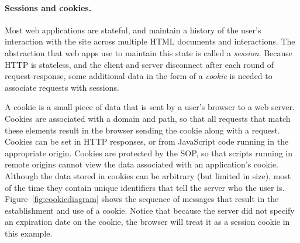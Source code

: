 \documentclass[11pt,twoside]{scrartcl}
\begin{document}
\paragraph{Sessions and cookies.} Most web applications are stateful, and maintain a history of the user's interaction with the site across multiple HTML documents and interactions. The abstraction that web apps use to maintain this state is called a \emph{session}. Because HTTP is stateless, and the client and server disconnect after each round of request-response, some additional data in the form of a \emph{cookie} is needed to associate requests with sessions.

A cookie is a small piece of data that is sent by a user's browser to a web server. Cookies are associated with a domain and path, so that all requests that match these elements result in the browser sending the cookie along with a request. Cookies can be set in HTTP responses, or from JavaScript code running in the appropriate origin. Cookies are protected by the SOP, so that scripts running in remote origins cannot view the data associated with an application's cookie. Although the data stored in cookies can be arbitrary (but limited in size), most of the time they contain unique identifiers that tell the server who the user is. Figure~\ref{fig:cookiediagram} shows the sequence of messages that result in the establishment and use of a cookie. Notice that because the server did not specify an expiration date on the cookie, the browser will treat it as a session cookie in this example.
\end{document}
